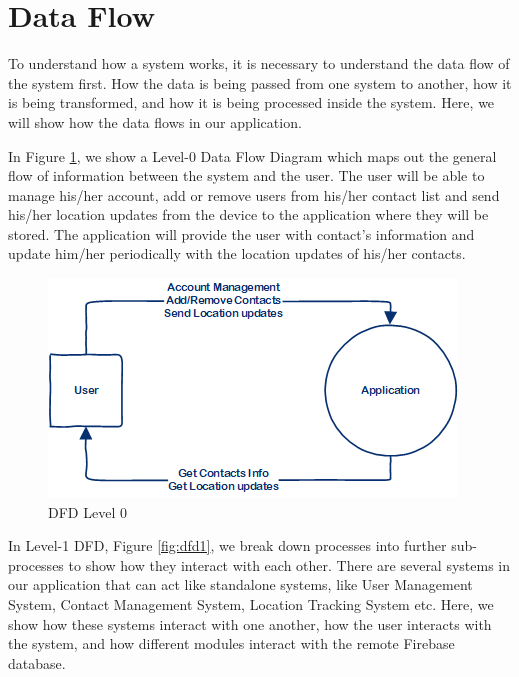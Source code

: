 \section{Data Flow}
To understand how a system works, it is necessary to understand the data flow of the system first. How the data is being passed from one system to another, how it is being transformed, and how it is being processed inside the system.
Here, we will show how the data flows in our application. 

In Figure \ref{fig:dfd0}, we show a Level-0 Data Flow Diagram which maps out the general flow of information between the system and the user. The user will be able to manage his/her account, add or remove users from his/her contact list and send his/her location updates from the device to the application where they will be stored. The application will provide the user with contact's information and update him/her periodically with the location updates of his/her contacts.
\begin{figure}
    \centering
        \includegraphics{images/dfd0.png}
    \caption{DFD Level 0}
    \label{fig:dfd0}
\end{figure}

In Level-1 DFD, Figure \ref{fig:dfd1}, we break down processes into further sub-processes to show how they interact with each other. There are several systems in our application that can act like standalone systems, like User Management System, Contact Management System, Location Tracking System etc. Here, we show how these systems interact with one another, how the user interacts with the system, and how different modules interact with the remote Firebase database.

